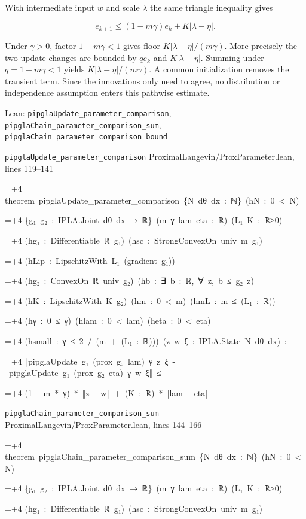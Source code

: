 \documentclass[11pt,a4paper]{article}
\newlength{\leancharwidth}
\newenvironment{leancode}{\par\smallskip\begingroup\ttfamily\footnotesize\raggedright
  \settowidth{\leancharwidth}{M}\setlength{\parskip}{0pt}\setlength{\parindent}{0pt}
  \frenchspacing}{\par\endgroup\smallskip}
\newcommand{\leanline}[2]{\hangindent=\dimexpr#1\leancharwidth+4\leancharwidth\relax
  \hangafter=1\noindent\hspace*{#1\leancharwidth}#2\par}
\newcommand{\leansource}[1]{\par{\footnotesize\color{leanmuted}#1}\par}
\begin{document}
With intermediate input \(w\) and scale \(\lambda\) the same triangle inequality gives

\[e_{k+1}\le(1-m\gamma)e_k+K|\lambda-\eta|.\]

Under \(\gamma>0\), factor \(1-m\gamma<1\) gives floor \(K|\lambda-\eta|/(m\gamma)\). More precisely the two update changes are bounded by \(q e_k\) and \(K|\lambda-\eta|\). Summing under \(q=1-m\gamma<1\) yields \(K|\lambda-\eta|/(m\gamma)\). A common initialization removes the transient term. Since the innovations only need to agree, no distribution or independence assumption enters this pathwise estimate.

\begin{leanbox}{Lean: \texttt{pipglaUpdate\_\allowbreak{}parameter\_\allowbreak{}comparison}, \texttt{pipglaChain\_\allowbreak{}parameter\_\allowbreak{}comparison\_\allowbreak{}sum}, \texttt{pipglaChain\_\allowbreak{}parameter\_\allowbreak{}comparison\_\allowbreak{}bound}}
\leansource{\texttt{pipglaUpdate\_\allowbreak{}parameter\_\allowbreak{}comparison} \quad ProximalLangevin/\allowbreak{}ProxParameter.lean, lines 119–141}
\begin{leancode}
\leanline{0}{theorem\ pipglaUpdate\_parameter\_comparison\ \{N\ dθ\ dx\ :\ ℕ\}\ (hN\ :\ 0\ <\ N)}
\leanline{4}{\{g₁\ g₂\ :\ IPLA.Joint\ dθ\ dx\ →\ ℝ\}\ (m\ γ\ lam\ eta\ :\ ℝ)\ (L₁\ K\ :\ ℝ≥0)}
\leanline{4}{(hg₁\ :\ Differentiable\ ℝ\ g₁)\ (hsc\ :\ StrongConvexOn\ univ\ m\ g₁)}
\leanline{4}{(hLip\ :\ LipschitzWith\ L₁\ (gradient\ g₁))}
\leanline{4}{(hg₂\ :\ ConvexOn\ ℝ\ univ\ g₂)\ (hb\ :\ ∃\ b\ :\ ℝ,\ ∀\ z,\ b\ ≤\ g₂\ z)}
\leanline{4}{(hK\ :\ LipschitzWith\ K\ g₂)\ (hm\ :\ 0\ <\ m)\ (hmL\ :\ m\ ≤\ (L₁\ :\ ℝ))}
\leanline{4}{(hγ\ :\ 0\ ≤\ γ)\ (hlam\ :\ 0\ <\ lam)\ (heta\ :\ 0\ <\ eta)}
\leanline{4}{(hsmall\ :\ γ\ ≤\ 2\ /\ (m\ +\ (L₁\ :\ ℝ)))\ (z\ w\ ξ\ :\ IPLA.State\ N\ dθ\ dx)\ :}
\leanline{4}{‖pipglaUpdate\ g₁\ (prox\ g₂\ lam)\ γ\ z\ ξ\ -\ pipglaUpdate\ g₁\ (prox\ g₂\ eta)\ γ\ w\ ξ‖\ ≤}
\leanline{6}{(1\ -\ m\ *\ γ)\ *\ ‖z\ -\ w‖\ +\ (K\ :\ ℝ)\ *\ |lam\ -\ eta|}
\end{leancode}
\leansource{\texttt{pipglaChain\_\allowbreak{}parameter\_\allowbreak{}comparison\_\allowbreak{}sum} \quad ProximalLangevin/\allowbreak{}ProxParameter.lean, lines 144–166}
\begin{leancode}
\leanline{0}{theorem\ pipglaChain\_parameter\_comparison\_sum\ \{N\ dθ\ dx\ :\ ℕ\}\ (hN\ :\ 0\ <\ N)}
\leanline{4}{\{g₁\ g₂\ :\ IPLA.Joint\ dθ\ dx\ →\ ℝ\}\ (m\ γ\ lam\ eta\ :\ ℝ)\ (L₁\ K\ :\ ℝ≥0)}
\leanline{4}{(hg₁\ :\ Differentiable\ ℝ\ g₁)\ (hsc\ :\ StrongConvexOn\ univ\ m\ g₁)}

\end{leancode}
\end{leanbox}
\end{document}
